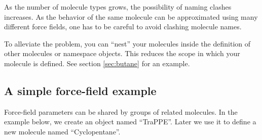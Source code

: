\documentclass[11pt]{article}
\begin{document}
As the number of molecule types grows, 
the possibility of naming clashes increases. 
As the behavior of the same molecule can be approximated 
using many different force fields, 
one has to be careful to avoid clashing molecule names.

To alleviate the problem, you can ``nest'' your 
molecules inside the definition of other molecules or 
namespace objects.
This reduces the scope in which your molecule is defined.
See section \ref{sec:butane} for an example.


\subsection{A simple force-field example}
Force-field parameters can be shared by groups of related molecules.
In the example below, we create an object named ``TraPPE''.
Later we use it to define a new molecule named ``Cyclopentane''.
\end{document}
